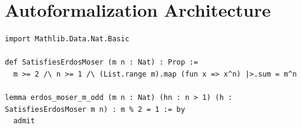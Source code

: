 \documentclass[12pt, a4paper]{article}
\begin{document}
\section{Autoformalization Architecture}
\begin{lstlisting}[language=lean, basicstyle=\ttfamily\small, breaklines=true]
import Mathlib.Data.Nat.Basic

def SatisfiesErdosMoser (m n : Nat) : Prop :=
  m >= 2 /\ n >= 1 /\ (List.range m).map (fun x => x^n) |>.sum = m^n

lemma erdos_moser_m_odd (m n : Nat) (hn : n > 1) (h : SatisfiesErdosMoser m n) : m % 2 = 1 := by
  admit
\end{lstlisting}
\end{document}
